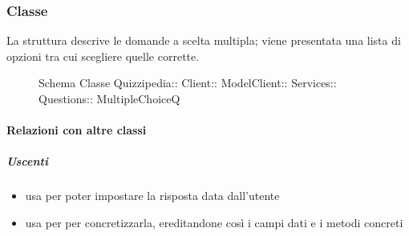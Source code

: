 \subsubsection{Classe }
La struttura descrive le domande a scelta multipla; viene presentata una lista di opzioni tra cui scegliere quelle corrette.
\begin{figure}[H]
\centering
\noindent{}
\caption[Schema Classe MultipleChoiceQ]{Schema Classe Quizzipedia:: Client:: ModelClient:: Services:: Questions:: MultipleChoiceQ}
\end{figure}
\paragraph{Relazioni con altre classi}
\subparagraph{Uscenti}
\begin{itemize}
\item usa  per poter impostare la risposta data dall'utente
\item usa  per per concretizzarla, ereditandone così i campi dati e i metodi concreti
\end{itemize}
